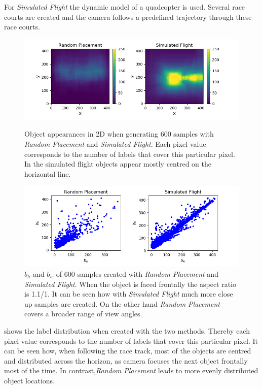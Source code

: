 For \textit{Simulated Flight} the dynamic model of a quadcopter is used. Several race courts are created and the camera follows a predefined trajectory through these race courts.

\begin{figure}
	\begin{minipage}{\textwidth}
		\includegraphics[width=\textwidth]{fig/heatmap_camplace}
		\caption{Object appearances in 2D when generating 600 samples with \textit{Random Placement} and  \textit{Simulated Flight}. Each pixel value corresponds to the number of labels that cover this particular pixel. In the simulated flight objects appear mostly centred on the horizontal line.}
		\label{fig:heatmap_camplace}
	\end{minipage}
	\begin{minipage}{\textwidth}
	\includegraphics[width=\textwidth]{fig/ar_train}
	\caption{$b_h$ and $b_w$ of 600 samples created with \textit{Random Placement} and  \textit{Simulated Flight}. When the object is faced frontally the aspect ratio is 1.1/1. It can be seen how with \textit{Simulated Flight} much more close up samples are created. On the other hand \textit{Random Placement} covers a broader range of view angles.}
	\label{fig:aspect_ratio_camplace}
	\end{minipage}
\end{figure}

 shows the label distribution when created with the two methods. Thereby each pixel value corresponds to the number of labels that cover this particular pixel. It can be seen how, when following the race track, most of the objects are centred and distributed across the horizon, as camera focuses the next object frontally most of the time. In contrast,\textit{Random Placement} leads to more evenly distributed object locations. 

